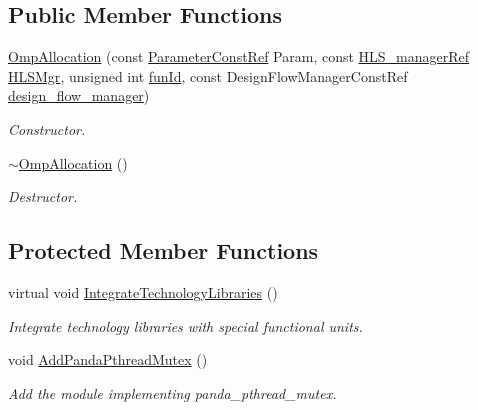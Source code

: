 \subsection*{Public Member Functions}
\begin{DoxyCompactItemize}
\item 
\hyperlink{classOmpAllocation_a6376b0abb7993ba2d126aec27c3fea2d}{Omp\+Allocation} (const \hyperlink{Parameter_8hpp_a37841774a6fcb479b597fdf8955eb4ea}{Parameter\+Const\+Ref} Param, const \hyperlink{hls__manager_8hpp_acd3842b8589fe52c08fc0b2fcc813bfe}{H\+L\+S\+\_\+manager\+Ref} \hyperlink{classHLS__step_ade85003a99d34134418451ddc46a18e9}{H\+L\+S\+Mgr}, unsigned int \hyperlink{classHLSFunctionStep_a3e6434fd86c698b0c70520b859bff5b0}{fun\+Id}, const Design\+Flow\+Manager\+Const\+Ref \hyperlink{classDesignFlowStep_ab770677ddf087613add30024e16a5554}{design\+\_\+flow\+\_\+manager})
\begin{DoxyCompactList}\small\item\em Constructor. \end{DoxyCompactList}\item 
\hyperlink{classOmpAllocation_afded4e8460c5854247bd8cd053a4e3bd}{$\sim$\+Omp\+Allocation} ()
\begin{DoxyCompactList}\small\item\em Destructor. \end{DoxyCompactList}\end{DoxyCompactItemize}
\subsection*{Protected Member Functions}
\begin{DoxyCompactItemize}
\item 
virtual void \hyperlink{classOmpAllocation_a7be1bcabcbba606451d0abe4e70970f2}{Integrate\+Technology\+Libraries} ()
\begin{DoxyCompactList}\small\item\em Integrate technology libraries with special functional units. \end{DoxyCompactList}\item 
void \hyperlink{classOmpAllocation_a5a8ea4456a4be776f88dee04f0a5cc6e}{Add\+Panda\+Pthread\+Mutex} ()
\begin{DoxyCompactList}\small\item\em Add the module implementing panda\+\_\+pthread\+\_\+mutex. \end{DoxyCompactList}\end{DoxyCompactItemize}
